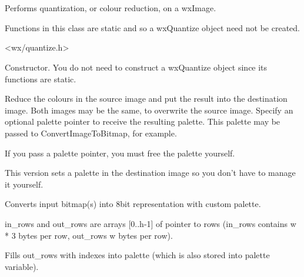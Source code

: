 \section{}\label{wxquantize}

Performs quantization, or colour reduction, on a wxImage.

Functions in this class are static and so a wxQuantize object need not be created.




<wx/quantize.h>




\label{wxquantizewxquantize}


Constructor. You do not need to construct a wxQuantize object since its functions are static.

\label{wxquantizequantize}


Reduce the colours in the source image and put the result into the
destination image. Both images may be the same, to overwrite the source image.
Specify an optional palette pointer to receive the resulting palette.
This palette may be passed to ConvertImageToBitmap, for example.

If you pass a palette pointer, you must free the palette yourself.


This version sets a palette in the destination image so you don't
have to manage it yourself.

\label{wxquantizedoquantize}


Converts input bitmap(s) into 8bit representation with custom palette.

in\_rows and out\_rows are arrays [0..h-1] of pointer to rows
(in\_rows contains w * 3 bytes per row, out\_rows w bytes per row).

Fills out\_rows with indexes into palette (which is also stored into palette variable).

